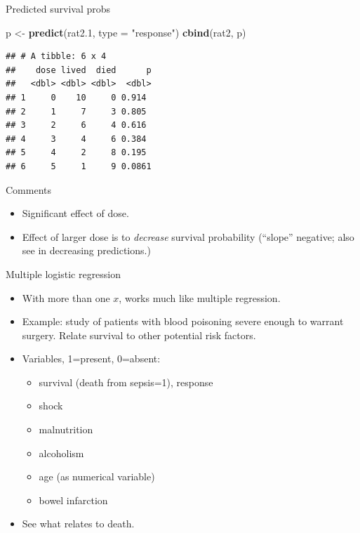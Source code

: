 \documentclass[
  ignorenonframetext,
]{beamer}
\newenvironment{Shaded}{\begin{snugshade}}{\end{snugshade}}
\newcommand{\DataTypeTok}[1]{\textcolor[rgb]{0.13,0.29,0.53}{#1}}
\newcommand{\FloatTok}[1]{\textcolor[rgb]{0.00,0.00,0.81}{#1}}
\newcommand{\KeywordTok}[1]{\textcolor[rgb]{0.13,0.29,0.53}{\textbf{#1}}}
\newcommand{\NormalTok}[1]{#1}
\newcommand{\StringTok}[1]{\textcolor[rgb]{0.31,0.60,0.02}{#1}}
\providecommand{\tightlist}{%
  \setlength{\itemsep}{0pt}\setlength{\parskip}{0pt}}
\begin{document}
\begin{frame}[fragile]{Predicted survival probs}
\protect\hypertarget{predicted-survival-probs}{}

\begin{Shaded}
\begin{Highlighting}[]
\NormalTok{p <-}\StringTok{ }\KeywordTok{predict}\NormalTok{(rat2}\FloatTok{.1}\NormalTok{, }\DataTypeTok{type =} \StringTok{"response"}\NormalTok{)}
\KeywordTok{cbind}\NormalTok{(rat2, p)}
\end{Highlighting}
\end{Shaded}

\begin{verbatim}
## # A tibble: 6 x 4
##    dose lived  died      p
##   <dbl> <dbl> <dbl>  <dbl>
## 1     0    10     0 0.914 
## 2     1     7     3 0.805 
## 3     2     6     4 0.616 
## 4     3     4     6 0.384 
## 5     4     2     8 0.195 
## 6     5     1     9 0.0861
\end{verbatim}

\end{frame}

\begin{frame}{Comments}
\protect\hypertarget{comments-11}{}

\begin{itemize}
\item
  Significant effect of dose.
\item
  Effect of larger dose is to \emph{decrease} survival probability
  (``slope'' negative; also see in decreasing predictions.)
\end{itemize}

\end{frame}

\begin{frame}{Multiple logistic regression}
\protect\hypertarget{multiple-logistic-regression}{}

\begin{itemize}
\item
  With more than one \(x\), works much like multiple regression.
\item
  Example: study of patients with blood poisoning severe enough to
  warrant surgery. Relate survival to other potential risk factors.
\item
  Variables, 1=present, 0=absent:

  \begin{itemize}
  \tightlist
  \item
    survival (death from sepsis=1), response
  \item
    shock
  \item
    malnutrition
  \item
    alcoholism
  \item
    age (as numerical variable)
  \item
    bowel infarction
  \end{itemize}
\item
  See what relates to death.
\end{itemize}

\end{frame}
\end{document}
